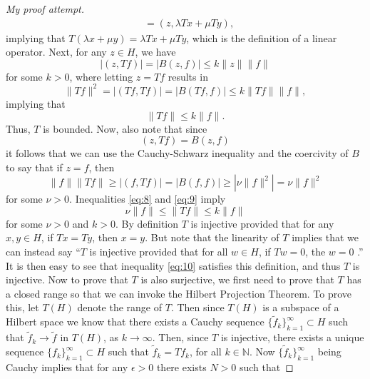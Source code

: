 \documentclass[11pt]{article}
\theoremstyle{definition}
\begin{document}
\begin{proof}[My proof attempt]
\begin{equation*}
\begin{aligned}
						 &= (z, \lambda Tx + \mu Ty),
		\end{aligned}
	\end{equation*}
	implying that $T(\lambda x + \mu y) = \lambda Tx + \mu Ty$, which is the definition of a linear operator.
	Next, for any $z \in H$, we have
	\begin{equation*}
		|(z,Tf)| = |B(z,f)| \leq k\|z\|\|f\|
	\end{equation*}
	for some $k>0$, where letting $z = Tf$ results in
	\begin{equation*}
		\|Tf\|^2 = |(Tf,Tf)| = |B(Tf,f)| \leq k\|Tf\|\|f\|,
	\end{equation*}
	implying that
	\begin{equation}
		\label{eq:8}
		\|Tf\| \leq k\|f\|.
	\end{equation}
	Thus, $T$ is bounded. Now, also note that since
	\begin{equation*}
		(z,Tf) = B(z,f)
	\end{equation*}
	it follows that we can use the Cauchy-Schwarz inequality and the coercivity of $B$ to say that if $z=f$, then
	\begin{equation}
		\label{eq:9}
		\|f\|\|Tf\| \geq |(f,Tf)| = |B(f,f)| \geq |\nu \|f\|^2| = \nu \|f\|^2
	\end{equation}
	for some $\nu > 0$. Inequalities \ref{eq:8} and \ref{eq:9} imply
	\begin{equation}
		\label{eq:10}
		\nu \|f\| \leq \|Tf\| \leq k \|f\|
	\end{equation}
	for some $\nu >0$ and $k >0$.
	By definition $T$ is injective provided that for any $x,y \in H$, if $Tx = Ty$, then $x=y$.
	But note that the linearity of $T$ implies that we can instead say ``$T$ is injective provided that
	for all $w \in H$, if $Tw = 0$, the $w = 0$ .'' It is then easy to see that inequality \ref{eq:10}
	satisfies this definition, and thus $T$ is injective.
	Now to prove that $T$ is also surjective, we first need to prove that $T$ has a closed range so that
	we can invoke the Hilbert Projection Theorem. To prove this, let $T(H)$ denote the range of $T$.
	Then since $T(H)$ is a subspace of a Hilbert space we know that there exists a Cauchy sequence $\{\tilde{f}_k\}_{k=1}^{\infty} \subset H$
	such that $\tilde{f}_k \rightarrow \tilde{f}$ in $T(H)$, as $k\rightarrow \infty$. Then, since $T$ is injective, there exists a unique
	sequence $\{f_k\}_{k=1}^{\infty} \subset H$ such that $\tilde{f}_k = Tf_k$, for all $k \in \mathbb{N}$. Now $\{\tilde{f}_k\}_{k=1}^{\infty}$
	being Cauchy implies that for any $\epsilon > 0$ there exists $N >0$ such that

\end{proof}
\end{document}
